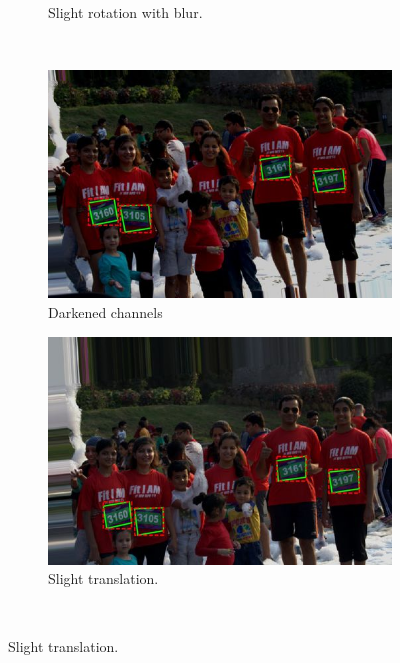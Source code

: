 \begin{figure}[h!]
\begin{subfigure}[b]{0.475\textwidth}
    \caption{Slight rotation with blur.}
  \end{subfigure}
  \hspace{\fill}
  \bigskip
  \\
  \hspace{\fill}
  \begin{subfigure}[b]{0.475\textwidth}
    \includegraphics[width=\textwidth]{images/dataset/augmentation/neg_multiply}
    \caption{Darkened channels}
  \end{subfigure}
  \hspace{\fill}
  \begin{subfigure}[b]{0.475\textwidth}
    \includegraphics[width=\textwidth]{images/dataset/augmentation/offset}
    \caption{Slight translation.}
  \end{subfigure}
  \hspace{\fill} 
  \bigskip
  \\

\end{figure}
